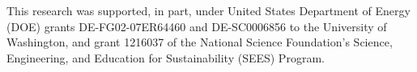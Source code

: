 \documentclass[gmd, manuscript]{copernicus}
\begin{document}


\begin{acknowledgements}
  This research was supported, in part, under United States Department of Energy (DOE) grants DE-FG02-07ER64460 and DE-SC0006856 to the University of Washington, and grant 1216037 of the National Science Foundation's Science, Engineering, and Education for Sustainability (SEES) Program.
\end{acknowledgements}




%
%
%









\end{document}
